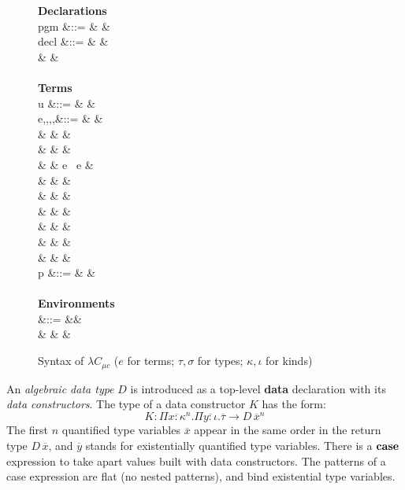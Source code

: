 \begin{figure}[H]
  \small
  \begin{syntax}
    \textbf{Declarations} \\
    pgm &::= &  &  \\
    decl &::= &  &  \\
    & & \quad {} \\ \\
    \textbf{Terms} \\
    u &::= &  &  \\
    e,\tau,\sigma,\kappa,\iota &::= &  &  \\
    & \mid & \star &  \\
    & \mid & \square &  \\
    & \mid & e \ e &  \\
    & \mid &  &  \\
    & \mid &  &  \\
    & \mid &  &  \\
    & \mid &  &  \\
    & \mid &  &  \\
    & \mid &  &  \\
    p &::= &  &  \\ \\
    \textbf{Environments} \\
    \Gamma &::= &\varnothing &  \\
    & \mid &  & 
  \end{syntax}
  \caption{Syntax of $\lambda C_{\mu c}$ ($e$ for terms; $\tau,\sigma$
    for types; $\kappa, \iota$ for kinds)}\label{fig:datasyn}
\end{figure}

An \emph{algebraic data type} $D$ is introduced as a top-level
\textbf{data} declaration with its \emph{data constructors}. The type
of a data constructor $K$ has the form:
\[
  K : \Pi\overline{x : \kappa}^{n}.\Pi\overline{y :
    \iota}.\overline{\tau} \rightarrow D\,\overline{x}^{n}
\]
The first $n$ quantified type variables $\overline{x}$ appear in the
same order in the return type $D\,\overline{x}$, and $\overline{y}$
stands for existentially quantified type variables. There is a $\mathbf{case}$
expression to take apart values built with data constructors. The
patterns of a case expression are flat (no nested patterns), and bind
existential type variables.

